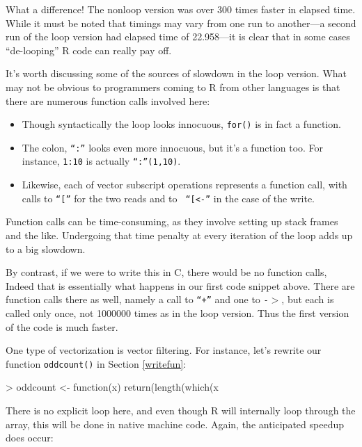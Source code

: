 \noindent
What a difference!  The nonloop version was over 300 times faster in
elapsed time.  While it must be noted that timings may vary from one run
to another---a second run of the loop version had elapsed time of
22.958---it is clear that in some cases ``de-looping'' R code can really
pay off.

It's worth discussing some of the sources of slowdown in the loop
version.  What may not be obvious to programmers coming to R from other
languages is that there are numerous function calls involved here:

\begin{itemize}

\item Though syntactically the loop looks innocuous, {\tt for()} is in
fact a function.

\item The colon, {\tt ``:''} looks even more innocuous, but it's a function
too.  For instance, {\tt 1:10} is actually {\tt ``:''(1,10)}.

\item Likewise, each of vector subscript operations represents a
function call, with calls to {\tt ``[''} for the two reads and to {\tt
``\verb+[<-+''} in the case of the write.

\end{itemize}

\noindent
Function calls can be time-consuming, as they involve setting up 
stack frames and the like.  Undergoing that time penalty at every 
iteration of the loop adds up to a big slowdown.

By contrast, if we were to write this in C, there would be no function
calls,  Indeed that is essentially what happens in our first code
snippet above.  There are function calls there as well, namely a call to
{\tt ``+''} and one to {\tt -}$>$, but each is called only once, not
1000000 times as in the loop version.  Thus the first version of the
code is much faster.

One type of vectorization is vector filtering.  For instance, let's
rewrite our function {\tt oddcount()} in Section \ref{writefun}:

\begin{Code}
> oddcount <- function(x) return(length(which(x%
\end{Code}

\noindent
There is no explicit loop here, and even though R will internally loop
through the array, this will be done in native machine code.  Again, the
anticipated speedup does occur:


